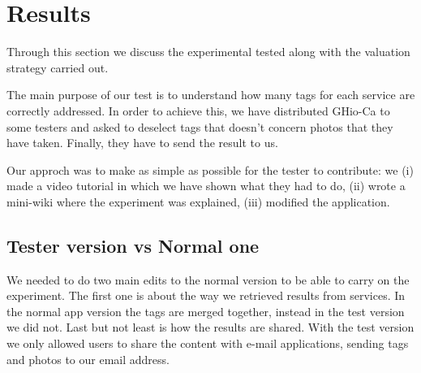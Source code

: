\section{Results}
\label{sec:results}

Through this section we discuss the experimental tested along with the valuation strategy carried out. 

The main purpose of our test is to understand how many tags for each service are correctly addressed. In order to achieve this, we have distributed GHio-Ca to some testers and asked to deselect tags that doesn't concern photos that they have taken. Finally, they have to send the result to us.

Our approch was to make as simple as possible for the tester to contribute: we (i) made a video tutorial in which we have shown what they had to do, (ii) wrote a mini-wiki where the experiment was explained, (iii) modified the application. 



\subsection{Tester version vs Normal one}
We needed to do two main edits to the normal version to be able to carry on the experiment. The first one is about the way we retrieved results from services. In the normal app version the tags are merged together, instead in the test version we did not. Last but not least is how the results are shared. With the test version we only allowed users to share the content with e-mail applications, sending tags and photos to our email address.

